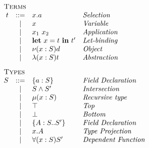 \begin{minipage}[t]{.5\textwidth}\[\begin{array}{r c l l}
    \multicolumn{4}{l}{\textsc{Terms}}                        \\
    t & ::= & x.a             & \textit{Selection           } \\
      &  |  & x               & \textit{Variable            } \\
      &  |  & x_1\ x_2        & \textit{Application         } \\
      &  |  & \LET{x}{t}{t'}  & \textit{Let-binding         } \\
      &  |  & \OBJ{x}{S}{d}   & \textit{Object              } \\
      &  |  & \ABS{x}{S}{t}   & \textit{Abstraction         } \\[3mm]
    \multicolumn{4}{l}{\textsc{Types}}                        \\
    S & ::= & \FDEC{a}{S}     & \textit{Field Declaration   } \\
      &  |  & \AGG{S}{S'}     & \textit{Intersection        } \\
      &  |  & \REC{x}{S}      & \textit{Recursive type      } \\
      &  |  & \top            & \textit{Top                 } \\
      &  |  & \bot            & \textit{Bottom              } \\
      &  |  & \TDEC{A}{S}{S'} & \textit{Field Declaration   } \\
      &  |  & x.A             & \textit{Type Projection     } \\
      &  |  & \DFUN{x}{S}{S'} & \textit{Dependent Function  } \\[3mm]
\end{array}\]\end{minipage}
